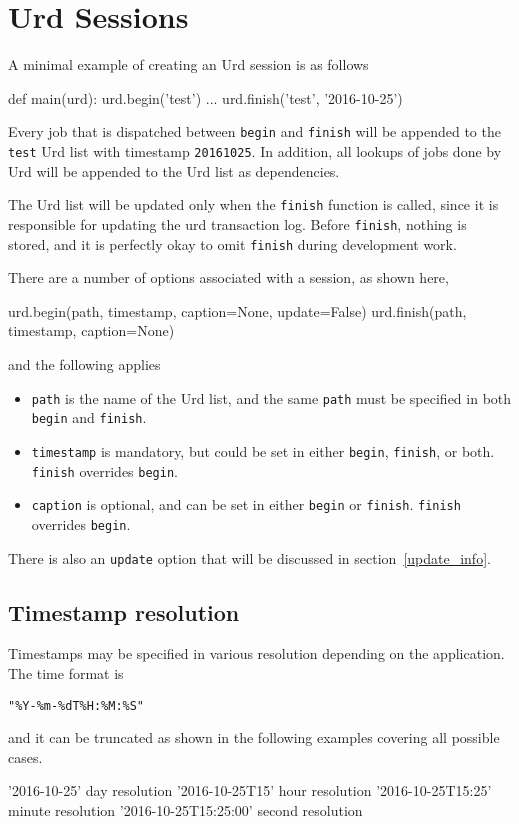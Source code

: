 \section{Urd Sessions}

A minimal example of creating an Urd session is as follows
\begin{python}
def main(urd):
    urd.begin('test')
    ...
    urd.finish('test', '2016-10-25')
\end{python}
Every job that is dispatched between \texttt{begin} and
\texttt{finish} will be appended to the \texttt{test} Urd list with
timestamp \texttt{20161025}.  In addition, all lookups of jobs done by
Urd will be appended to the Urd list as dependencies.

The Urd list will be updated only when the \texttt{finish} function is
called, since it is responsible for updating the urd transaction log.
Before \texttt{finish}, nothing is stored, and it is perfectly okay to
omit \texttt{finish} during development work.

There are a number of options associated with a session, as shown
here,
\begin{python}
urd.begin(path, timestamp, caption=None, update=False)
urd.finish(path, timestamp, caption=None)
\end{python}
and the following applies
\begin{itemize}
\item [] \texttt{path} is the name of the Urd list, and the same
  \texttt{path} must be specified in both \texttt{begin} and
  \texttt{finish}.

\item [] \texttt{timestamp} is mandatory, but could be set in either
  \texttt{begin}, \texttt{finish}, or both.  \texttt{finish}
  overrides \texttt{begin}.  

\item [] \texttt{caption} is optional, and can be set in either
  \texttt{begin} or \texttt{finish}.  \texttt{finish} overrides
  \texttt{begin}.  
\end{itemize}
There is also an \texttt{update} option that will be discussed in
section~\ref{update_info}.



\subsection{Timestamp resolution}

Timestamps may be specified in various resolution depending on the
application.  The time format is
\begin{verbatim}
"%Y-%m-%dT%H:%M:%S"
\end{verbatim}
and it can be truncated as shown in the following examples covering all possible cases.
\begin{python}
'2016-10-25'               day resolution
'2016-10-25T15'            hour resolution
'2016-10-25T15:25'         minute resolution
'2016-10-25T15:25:00'      second resolution
\end{python}



